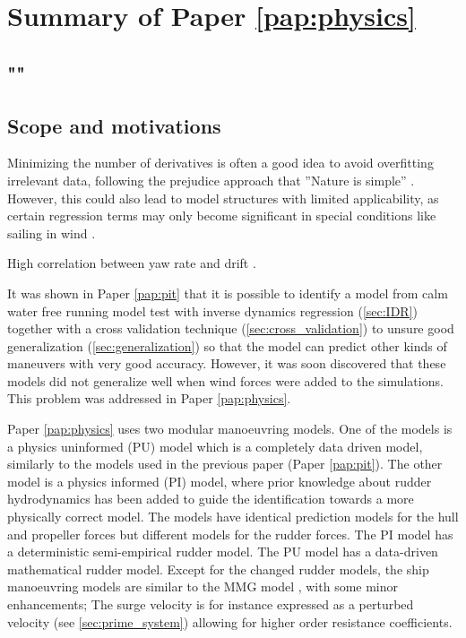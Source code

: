 \section{Summary of Paper \ref{pap:physics}}
\subsection*{""}
\subsection*{Scope and motivations}

\textcolor{ref}{
Minimizing the number of derivatives is often a good idea to avoid overfitting irrelevant data, following the prejudice approach that ''Nature is simple'' \cite{ljungPerspectivesSystemIdentification2010}. However, this could also lead to model structures with limited applicability, as certain regression terms may only become significant in special conditions like sailing in wind \cite{abkowitzMEASUREMENTHYDRODYNAMICCHARACTERISTICS1980}.
}

\textcolor{ref}{
High correlation between yaw rate and drift \cite{yoonIdentificationHydrodynamicCoefficients2003}.
}

It was shown in Paper \ref{pap:pit} that it is possible to identify a model from calm water free running model test with inverse dynamics regression (\autoref{sec:IDR}) together with a cross validation technique (\autoref{sec:cross_validation}) to unsure good generalization (\autoref{sec:generalization}) so that the model can predict other kinds of maneuvers with very good accuracy. However, it was soon discovered that these models did not generalize well when wind forces were added to the simulations. This problem was addressed in Paper \ref{pap:physics}.

Paper \ref{pap:physics} uses two modular manoeuvring models. One of the models is a physics uninformed (PU) model which is a completely data driven model, similarly to the models used in the previous paper (Paper \ref{pap:pit}).
The other model is a physics informed (PI) model, where prior knowledge about rudder hydrodynamics has been added to guide the identification towards a more physically correct model. 
The models have identical prediction models for the hull and propeller forces but different models for the rudder forces. The PI model has a deterministic semi-empirical rudder model. The PU model has a data-driven mathematical rudder model. Except for the changed rudder models, the ship manoeuvring models are similar to the MMG model \cite{yasukawaIntroductionMMGStandard2015}, with some minor enhancements; The surge velocity is for instance expressed as a perturbed velocity (see \autoref{sec:prime_system}) allowing for higher order resistance coefficients.

